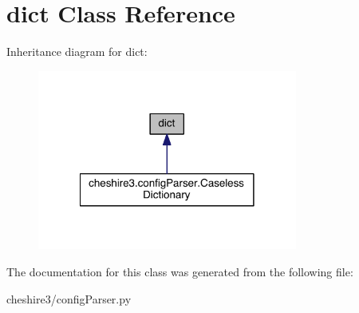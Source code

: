 \hypertarget{classdict}{\section{dict Class Reference}
\label{classdict}
}


Inheritance diagram for dict\-:
\nopagebreak
\begin{figure}[H]
\begin{center}
\leavevmode
\includegraphics[width=242pt]{classdict__inherit__graph}
\end{center}
\end{figure}


The documentation for this class was generated from the following file\-:\begin{DoxyCompactItemize}
\item 
cheshire3/config\-Parser.\-py\end{DoxyCompactItemize}
